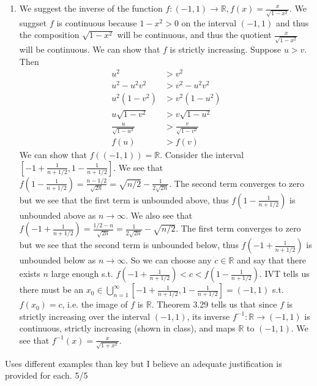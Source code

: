 \documentclass{article}
\begin{document}
\begin{enumerate}
\begin{enumerate}
      \item We suggest the inverse of the 
      function $f:(-1, 1)\to \mathbb{R}, f(x) = \frac{x}{\sqrt{1-x^2}}$.
      We suggset $f$ is continuous because
      $1-x^2 > 0$ on the interval $(-1,1)$ and thus
      the composition $\sqrt{1-x^2}$ will be continuous,
      and thus the quotient $\frac{x}{\sqrt{1-x^2}}$ will be continuous.
      We can show that $f$ is strictly increasing.
      Suppose $u > v$.
      Then
      \begin{align*}
        u^2 &> v^2\\
        u^2 -u^2v^2 &> v^2 - u^2v^2\\
        u^2(1-v^2) &> v^2(1-u^2)\\
        u\sqrt{1-v^2} &> v\sqrt{1-u^2}\\
        \frac{u}{\sqrt{1-u^2}} &> \frac{v}{\sqrt{1-v^2}}\\
        f(u) &> f(v)
      \end{align*}
      We can show that $f((-1, 1)) = \mathbb{R}$.
      Consider the interval $[-1 + \frac{1}{n+1/2}, 1 - \frac{1}{n+1/2}]$.
      We see that $f(1 - \frac{1}{n+1/2}) = \frac{n-1/2}{\sqrt{2n}} = \sqrt{n/2}-\frac{1}{2\sqrt{2n}}$.
      The second term converges to zero but we see that the first term is unbounded above,
      thus $f(1 - \frac{1}{n+1/2})$ is unbounded above as $n\to\infty$.
      We also see that $f(-1 + \frac{1}{n+1/2}) = \frac{1/2-n}{\sqrt{2n}} = \frac{1}{2\sqrt{2n}}-\sqrt{n/2}$.
      The first term converges to zero but we see that the second term is unbounded below,
      thus $f(-1 + \frac{1}{n+1/2})$ is unbounded below as $n\to\infty$.
      So we can choose any $c\in\mathbb{R}$ and say that there exists $n$ 
      large enough s.t. $f(-1 + \frac{1}{n+1/2}) < c < f(1 - \frac{1}{n+1/2})$.
      IVT tells us there must be an $x_0\in \bigcup\limits_{n=1}^{\infty}[-1 + \frac{1}{n+1/2}, 1 - \frac{1}{n+1/2}]
      =(-1, 1)$ s.t. $f(x_0)=c$, i.e. the image of $f$ is $\mathbb{R}$.
      Theorem 3.29 tells us that since $f$ is strictly increasing
      over the interval $(-1,1)$,
      its inverse $f^{-1}: \mathbb{R}\to (-1, 1)$
      is continuous, strictly increasing (shown in class), and maps $\mathbb{R}$ to $(-1, 1)$. 
      We see that $f^{-1}(x) = \frac{x}{\sqrt{1+x^2}}$.
    \end{enumerate}

    
    \color{Red}
    Uses different examples than key but I believe an adequate justification is 
    provided for each. 5/5
    \color{Black}


\end{enumerate}
\end{document}
